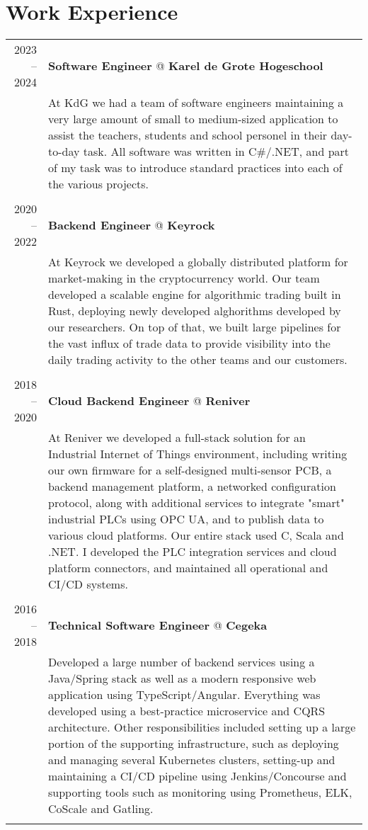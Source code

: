 \documentclass[a4paper,10pt]{article}
\begin{document}
\section{\textcolor{awesome-red}{Wor}k Experience}
	\begin{tabular}{r|p{11cm}}

	\textsc{2023 – 2024} & \textbf{Software Engineer} @ \textbf{Karel de Grote Hogeschool} \\ 
	& \footnotesize{At KdG we had a team of software engineers maintaining a very large amount of small to medium-sized application to assist the teachers, students and school personel in their day-to-day task. All software was written in C\#/.NET, and part of my task was to introduce standard practices into each of the various projects. } \\
	\multicolumn{2}{c}{} \\

	\textsc{2020 – 2022} & \textbf{Backend Engineer} @ \textbf{Keyrock} \\ 
	& \footnotesize{At Keyrock we developed a globally distributed platform for market-making in the cryptocurrency world. Our team developed a scalable engine for algorithmic trading built in Rust, deploying newly developed alghorithms developed by our researchers. On top of that, we built large pipelines for the vast influx of trade data to provide visibility into the daily trading activity to the other teams and our customers.} \\
	\multicolumn{2}{c}{} \\
        

    \textsc{2018 – 2020} & \textbf{Cloud Backend Engineer} @ \textbf{Reniver} \\ 
	& \footnotesize{At Reniver we developed a full-stack solution for an Industrial Internet of Things environment, including writing our own firmware for a self-designed multi-sensor PCB, a backend management platform, a networked configuration protocol, along with additional services to integrate "smart" industrial PLCs using OPC UA, and to publish data to various cloud platforms. Our entire stack used C, Scala and .NET. I developed the PLC integration services and cloud platform connectors, and maintained all operational and CI/CD systems.} \\
	\multicolumn{2}{c}{} \\
	
	
	\textsc{2016 – 2018} & \textbf{Technical Software Engineer} @ \textbf{Cegeka} \\ 
	& \footnotesize{Developed a large number of backend services using a Java/Spring stack as well as a modern responsive web application using TypeScript/Angular. Everything was developed using a best-practice microservice and CQRS architecture. Other responsibilities included setting up a large portion of the supporting infrastructure, such as deploying and managing several Kubernetes clusters, setting-up and maintaining a CI/CD pipeline using Jenkins/Concourse and supporting tools such as monitoring using Prometheus, ELK, CoScale and Gatling.} \\
	\multicolumn{2}{c}{} \\


\end{tabular}
\end{document}
